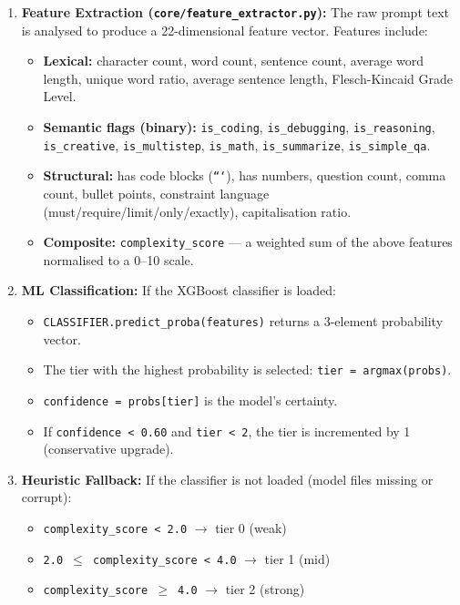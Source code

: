 \documentclass[12pt,a4paper]{report}
\begin{document}
\begin{enumerate}[nosep]
    \item \textbf{Feature Extraction (\texttt{core/feature\_extractor.py}):} The raw prompt text is analysed to produce a 22-dimensional feature vector. Features include:
    \begin{itemize}[nosep]
        \item \textbf{Lexical:} character count, word count, sentence count, average word length, unique word ratio, average sentence length, Flesch-Kincaid Grade Level.
        \item \textbf{Semantic flags (binary):} \texttt{is\_coding}, \texttt{is\_debugging}, \texttt{is\_reasoning}, \texttt{is\_creative}, \texttt{is\_multistep}, \texttt{is\_math}, \texttt{is\_summarize}, \texttt{is\_simple\_qa}.
        \item \textbf{Structural:} has code blocks (\texttt{```}), has numbers, question count, comma count, bullet points, constraint language (must/require/limit/only/exactly), capitalisation ratio.
        \item \textbf{Composite:} \texttt{complexity\_score} --- a weighted sum of the above features normalised to a 0--10 scale.
    \end{itemize}

    \item \textbf{ML Classification:} If the XGBoost classifier is loaded:
    \begin{itemize}[nosep]
        \item \texttt{CLASSIFIER.predict\_proba(features)} returns a 3-element probability vector.
        \item The tier with the highest probability is selected: \texttt{tier = argmax(probs)}.
        \item \texttt{confidence = probs[tier]} is the model's certainty.
        \item If \texttt{confidence < 0.60} and \texttt{tier < 2}, the tier is incremented by 1 (conservative upgrade).
    \end{itemize}

    \item \textbf{Heuristic Fallback:} If the classifier is not loaded (model files missing or corrupt):
    \begin{itemize}[nosep]
        \item \texttt{complexity\_score < 2.0} $\rightarrow$ tier 0 (weak)
        \item \texttt{2.0 $\le$ complexity\_score < 4.0} $\rightarrow$ tier 1 (mid)
        \item \texttt{complexity\_score $\ge$ 4.0} $\rightarrow$ tier 2 (strong)
    \end{itemize}


\end{enumerate}
\end{document}
